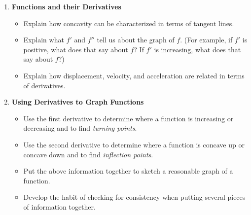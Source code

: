 \documentclass{article}
\begin{document}
\begin{enumerate}[start=8, topsep=0pt]
\item \textbf{Functions and their Derivatives} %
  \begin{itemize}

  \item Explain how concavity can be characterized in terms of tangent lines.

  \item Explain what $f'$ and $f''$ tell us about the graph of $f$. (For example, if $f'$ is positive, what does that say about $f$? If $f'$ is increasing, what does that say about $f$?)

  \item Explain how displacement, velocity, and acceleration are related in terms of derivatives.

  \end{itemize}

\item \textbf{Using Derivatives to Graph Functions} %
  \begin{itemize}

  \item Use the first derivative to determine where a function is
    increasing or decreasing and to find \emph{turning points}.

  \item Use the second derivative to determine where a function is
    concave up or concave down and to find \emph{inflection points}. 

  \item Put the above information together to sketch a reasonable graph
    of a function.

  \item Develop the habit of checking for consistency when putting several pieces of information together. 
  \end{itemize}

\end{enumerate}
\end{document}
